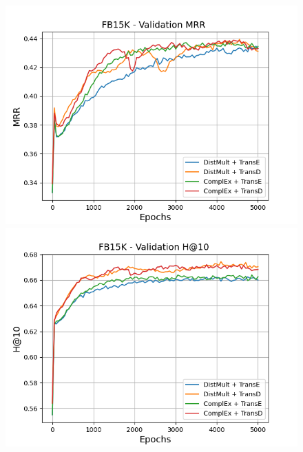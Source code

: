 \begin{figure}[H]
    \centering
    \begin{minipage}{.5\textwidth}
      \centering
      \includegraphics[width=\linewidth]{figures/results/gan_train/pretrained/random/fb15k/random_fb15k_mrrs.png}
    \end{minipage}%
    \begin{minipage}{.5\textwidth}
      \centering
      \includegraphics[width=\linewidth]{figures/results/gan_train/pretrained/random/fb15k/random_fb15k_hit10.png}
    \end{minipage}
    

\end{figure}
